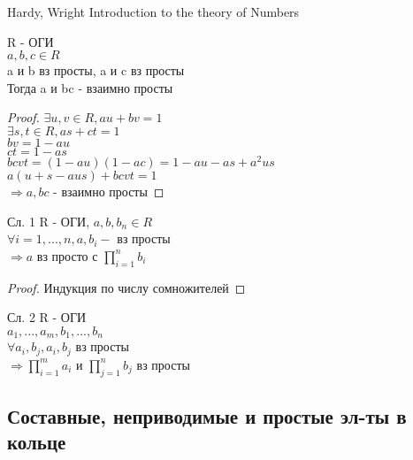 Hardy, Wright Introduction to the theory of Numbers \\

\begin{lemma}
	R - ОГИ \\
	$ a,b,c \in R $ \\
	a и b вз просты, a и c вз просты \\
	Тогда a и bc - взаимно просты \\
	\begin{proof}
		$ \exists u,v \in R, au + bv = 1 $ \\
		$ \exists s,t \in R, as + ct = 1 $ \\
		$ bv = 1 - au $ \\
		$ ct = 1 - as $ \\
		$ bcvt = (1-au)(1-ac) = 1 - au - as + a^2us $ \\
		$ a(u+s-aus) + bcvt = 1 $ \\
		$ \Rightarrow a, bc $ - взаимно просты 
	\end{proof}
\end{lemma}
Сл. 1 R - ОГИ, $a, b, b_n \in R$ \\
$ \forall i = 1,...,n, a, b_i - $ вз просты \\
$ \Rightarrow a $ вз просто с $ \prod_{i=1}^{n} b_i $ \\
\begin{proof}
	Индукция по числу сомножителей 	
\end{proof}
Сл. 2 R - ОГИ \\
$ a_1, ..., a_m, b_1,..., b_n $ \\
$ \forall a_i, b_j, a_i, b_j $ вз просты \\
$ \Rightarrow \prod_{i=1}^m a_i $ и $ \prod_{j=1}^n b_j $ вз просты \\

\subsection{Составные, неприводимые и простые эл-ты в кольце}

